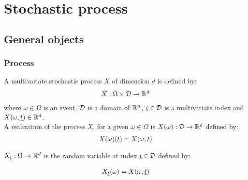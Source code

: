 \newpage
{}
\section{Stochastic process}


\subsection{General objects}

\subsubsection{Process}

A multivariate stochastic process $X$ of dimension $d$ is defined by:
\begin{align}\label{processDef}
X: \Omega \times{\mathcal D} \rightarrow {\mathbb R}^d
\end{align}
where $\omega \in \Omega$ is an event, ${\mathcal D}$ is a domain of ${\mathbb R}^n$, ${\underline{t}}\in {\mathcal D}$ is a multivariate index and $X(\omega, {\underline{t}}) \in {\mathbb R}^d$.\\

A realization of the process $X$, for a given $\omega \in \Omega$ is $X(\omega): {\mathcal D}  \rightarrow {\mathbb R}^d$ defined by:
\begin{align}\label{continuousReal}
X(\omega)({\underline{t}})=X(\omega, {\underline{t}})
\end{align}

$X_{{\underline{t}}}: \Omega \rightarrow {\mathbb R}^d$ is the random variable at index ${\underline{t}} \in {\mathcal D}$ defined by:

\begin{align}\label{RandomVarVertex}
X_{{\underline{t}}}(\omega)=X(\omega, {\underline{t}})
\end{align}


